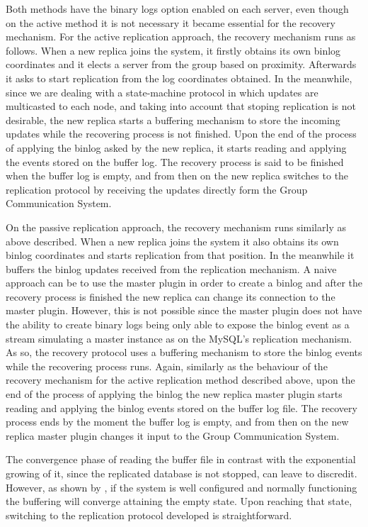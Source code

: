 Both methods have the binary logs option enabled on each server, even though on the active method it is not necessary it became essential for the recovery mechanism.
For the active replication approach, the recovery mechanism runs as follows. When a new replica joins the system, it firstly obtains its own binlog coordinates and it elects a server from the group based on proximity. Afterwards it asks to start replication from the log coordinates obtained. In the meanwhile, since we are dealing with a state-machine protocol in which updates are multicasted to each node, and taking into account that stoping replication is not desirable, the new replica starts a buffering mechanism to store the incoming updates while the recovering process is not finished. Upon the end of the process of applying the binlog asked by the new replica, it starts reading and applying the events stored on the buffer log. The recovery process is said to be finished when the buffer log is empty, and from then on the new replica switches to the replication protocol by receiving the updates directly form the Group Communication System. 

On the passive replication approach, the recovery mechanism runs similarly as above described. When a new replica joins the system it also obtains its own binlog coordinates and starts replication from that position. In the meanwhile it buffers the binlog updates received from the replication mechanism. A naive approach can be to use the master plugin in order to create a binlog and after the recovery process is finished the new replica can change its connection to the master plugin. However, this is not possible since the master plugin does not have the ability to create binary logs being only able to expose the binlog event as a stream simulating a master instance as on the MySQL's replication mechanism. As so, the recovery protocol uses a buffering mechanism to store the binlog events while the recovering process runs. Again, similarly as the behaviour of the recovery mechanism for the active replication method described above, upon the end of the process of applying the binlog the new replica master plugin starts reading and applying the binlog events stored on the buffer log file. The recovery process ends by the moment the buffer log is empty, and from then on the new replica master plugin changes it input to the Group Communication System. 

The convergence phase of reading the buffer file in contrast with the exponential growing of it, since the replicated database is not stopped, can leave to discredit. However, as shown by \cite{Vilaca:2009:CDC:1637865.1638353}, if the system is well configured and normally functioning the buffering will converge attaining the empty state. Upon reaching that state, switching to the replication protocol developed is straightforward.

